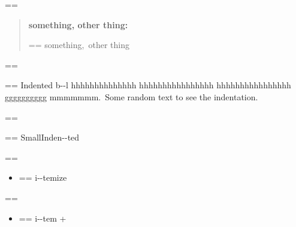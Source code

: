 \documentclass{book}
\makeatletter
\newenvironment{Texinfopreformatted}{%
  \par\GNUTobeylines\obeyspaces\frenchspacing\parskip=\z@\parindent=\z@}{}
{\catcode`\^^M=13 \gdef\GNUTobeylines{\catcode`\^^M=13 \def^^M{\null\par}}}
\newenvironment{Texinfoindented}{\begin{list}{}{}\item\relax}{\end{list}}
\renewcommand{\_}{\Texinfounderscore\discretionary{}{}{}}
\makeatother
\begin{document}
{{\begin{Texinfoindented}
\begin{quote}
\begin{footnotesize}
\end{footnotesize}
\end{quote}
\begin{Texinfopreformatted}%
\ttfamily 
\end{Texinfopreformatted}
\begin{quote}
\begin{footnotesize}
\textbf{something, other thing:} \begin{Texinfopreformatted}%
\ttfamily something,\ other thing
\end{Texinfopreformatted}
\end{footnotesize}
\end{quote}
\begin{Texinfopreformatted}%
\ttfamily 
\end{Texinfopreformatted}
\begin{Texinfoindented}
\begin{Texinfopreformatted}%
\ttfamily Indented b{-}{-}l hhhhhhhhhhhhhh hhhhhhhhhhhhhhhh hhhhhhhhhhhhhhhh gggggggggg
mmmmmmm.\  Some random text to see the indentation.
\end{Texinfopreformatted}
\end{Texinfoindented}
\begin{Texinfopreformatted}%
\ttfamily 
\end{Texinfopreformatted}
\begin{Texinfoindented}
\begin{footnotesize}
\begin{Texinfopreformatted}%
\ttfamily SmallInden{-}{-}ted
\end{Texinfopreformatted}
\end{footnotesize}
\end{Texinfoindented}
\begin{Texinfopreformatted}%
\ttfamily 
\end{Texinfopreformatted}
\begin{itemize}
\item \begin{Texinfopreformatted}%
\ttfamily i{-}{-}temize
\end{Texinfopreformatted}
\end{itemize}
\begin{Texinfopreformatted}%
\ttfamily 
\end{Texinfopreformatted}
\begin{itemize}[label=+]
\item \begin{Texinfopreformatted}%
\ttfamily i{-}{-}tem +
\end{Texinfopreformatted}

\end{itemize}
\end{Texinfoindented}}}
\end{document}
